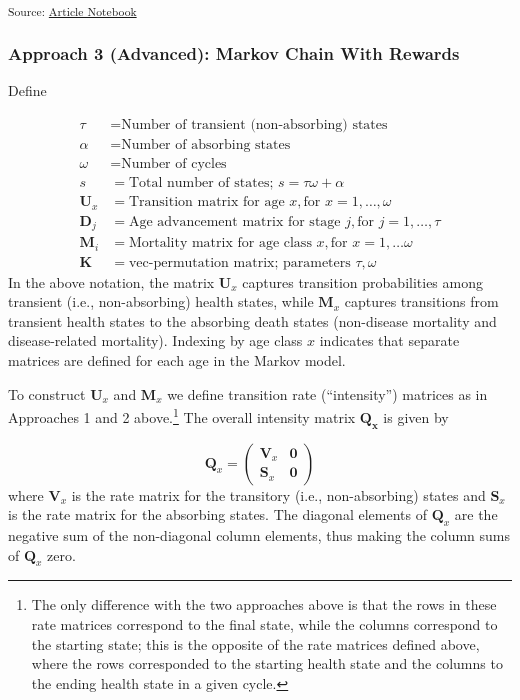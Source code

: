 \documentclass[
]{agujournal2019}
\begin{document}
\textsubscript{Source:
\href{https://graveja0.github.io/dalys/index.qmd.html}{Article
Notebook}}

\subsubsection{Approach 3 (Advanced): Markov Chain With
Rewards}\label{approach-3-advanced-markov-chain-with-rewards}

Define

\[
\begin{aligned}
\tau &= \text{Number of transient (non-absorbing) states}\\
\alpha &= \text{Number of absorbing states}\\
\omega &= \text{Number of cycles} \\
s &= \text{Total number of states; }s=\tau\omega+\alpha \\
\mathbf{U}_{x} &= \text{Transition matrix for age }x, \text{for }x=1,\dots,\omega\\
\mathbf{D}_{j} &=\text{Age advancement matrix for stage }j, \text{for }j=1,\dots,\tau \\
\mathbf{M}_{i} &= \text{Mortality matrix for age class }x, \text{for } x = 1,\dots\omega \\
\mathbf{K} &= \text{vec-permutation matrix; parameters }\tau,\omega
\end{aligned}
\] In the above notation, the matrix \(\mathbf{U}_x\) captures
transition probabilities among transient (i.e., non-absorbing) health
states, while \(\mathbf{M}_x\) captures transitions from transient
health states to the absorbing death states (non-disease mortality and
disease-related mortality). Indexing by age class \(x\) indicates that
separate matrices are defined for each age in the Markov model.

To construct \(\mathbf{U}_x\) and \(\mathbf{M}_x\) we define transition
rate (``intensity'') matrices as in Approaches 1 and 2 above.\footnote{The
  only difference with the two approaches above is that the rows in
  these rate matrices correspond to the final state, while the columns
  correspond to the starting state; this is the opposite of the rate
  matrices defined above, where the rows corresponded to the starting
  health state and the columns to the ending health state in a given
  cycle.} The overall intensity matrix \(\mathbf{Q_x}\) is given by

\[
\mathbf{Q}_x=\left(\begin{array}{c|c}
\mathbf{V}_x & \mathbf{0} \\
\hline \mathbf{S}_x  & \mathbf{0}
\end{array}\right)
\] where \(\mathbf{V}_x\) is the rate matrix for the transitory (i.e.,
non-absorbing) states and \(\mathbf{S}_x\) is the rate matrix for the
absorbing states. The diagonal elements of \(\mathbf{Q}_x\) are the
negative sum of the non-diagonal column elements, thus making the column
sums of \(\mathbf{Q}_x\) zero.
\end{document}
